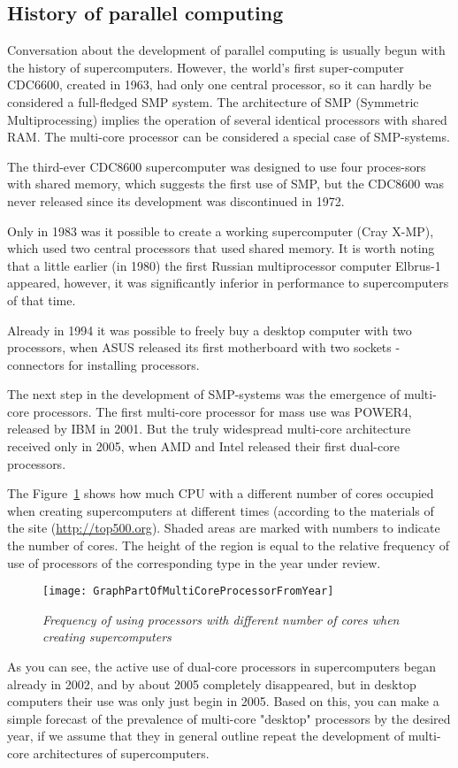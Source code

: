 { %
	\subsection{History of parallel computing}
	\par Conversation about the development of parallel computing is usually begun with the history of supercomputers. However, the world's first super-computer CDC6600, created in 1963, had only one central processor, so it can hardly be considered a full-fledged SMP system. The architecture of SMP (Symmetric Multiprocessing) implies the operation of several identical processors with shared RAM. The multi-core processor can be considered a special case of SMP-systems.
	\par The third-ever CDC8600 supercomputer was designed to use four proces-sors with shared memory, which suggests the first use of SMP, but the CDC8600 was never released since its development was discontinued in 1972.
	\par Only in 1983 was it possible to create a working supercomputer (Cray X-MP), which used two central processors that used shared memory. It is worth noting that a little earlier (in 1980) the first Russian multiprocessor computer Elbrus-1 appeared, however, it was significantly inferior in performance to supercomputers of that time.
	\par Already in 1994 it was possible to freely buy a desktop computer with two processors, when ASUS released its first motherboard with two sockets - connectors for installing processors.
	\par The next step in the development of SMP-systems was the emergence of multi-core processors. The first multi-core processor for mass use was POWER4, released by IBM in 2001. But the truly widespread multi-core architecture received only in 2005, when AMD and Intel released their first dual-core processors.
	\par The Figure~\ref{GraphPartOfMultiCoreProcessorFromYear:image} shows how much CPU with a different number of cores occupied when creating supercomputers at different times (according to the materials of the site (\url{http://top500.org}). Shaded areas are marked with numbers to indicate the number of cores. The height of the region is equal to the relative frequency of use of processors of the corresponding type in the year under review.
	\begin{figure}[H]
		\texttt{[image: GraphPartOfMultiCoreProcessorFromYear]}
		\caption{\textit{Frequency of using processors with different number of cores when creating supercomputers}}
		\label{GraphPartOfMultiCoreProcessorFromYear:image}
	\end{figure}
	\par As you can see, the active use of dual-core processors in supercomputers began already in 2002, and by about 2005 completely disappeared, but in desktop computers their use was only just begin in 2005. Based on this, you can make a simple forecast of the prevalence of multi-core "desktop"  processors by the desired year, if we assume that they in general outline repeat the development of multi-core architectures of supercomputers.
	\par
}
